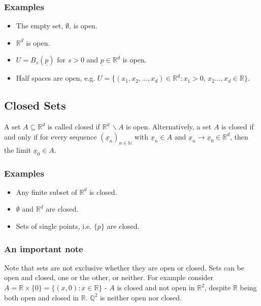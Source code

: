 \documentclass[12pt]{article}
\newcommand{\seq}[2]{(#1_#2)_{#2\in\mathbb{N}}}
\begin{document}
\subsubsection*{Examples}
\begin{itemize}
    \item The empty set, \(\emptyset\), is open.
    \item \(\mathbb{R}^d\) is open.
    \item \(U=B_s(\underline{p})\) for \(s>0\) and \(\underline{p}\in\mathbb{R}^d\) is open.
    \item Half spaces are open, e.g. \(U=\{(x_1,x_2,\dots,x_d)\in\mathbb{R}^d:x_1>0,\, x_2\dots,x_d\in\mathbb{R}\}\).
\end{itemize}
\subsection{Closed Sets}
A set \(A\subseteq\mathbb{R}^d\) is called closed if \(\mathbb{R}^d\,\backslash A\) is open. Alternatively, a set \(A\) is closed if and only if for every sequence \(\seq{\underline{x}}{n}\) with \(\underline{x}_n\in A\) and \(\underline{x}_n\to \underline{x}_0\in\mathbb{R}^d\), then the limit \(\underline{x}_0\in A\).
\subsubsection{Examples}
\begin{itemize}
    \item Any finite subset of \(\mathbb{R}^d\) is closed.
    \item \(\emptyset\) and \(\mathbb{R}^d\) are closed.
    \item Sets of single points, i.e. \(\{p\}\) are closed.
\end{itemize}
\subsubsection{An important note}
Note that sets are not exclusive whether they are open or closed. Sets can be open and closed, one or the other, or neither. For example consider \(A=\mathbb{R}\times\{0\}=\{(x,0):x\in\mathbb{R}\}\) - \(A\) is closed and not open in \(\mathbb{R}^2\), despite \(\mathbb{R}\) being both open and closed in \(\mathbb{R}\). \(\mathbb{Q}^2\) is neither open nor closed.
\end{document}
